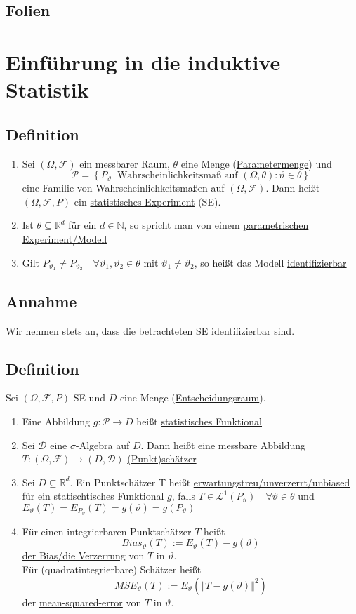 \documentclass[german,10pt,oneside, fleqn, a4paper]{article}
\newcommand {\R}	{\mathbb{R}}
\newcommand {\N}	{\mathbb{N}}
\newcommand{\ra}{\rightarrow}
\newcommand{\brc}[1]{\left(#1\right)}
\newcommand{\brac}[1]{\left\lbrace #1\right\rbrace}
\newcommand{\norm}[1]{\left\Vert #1 \right\Vert}
\newcommand{\mc}[1]{\mathcal{#1}}
\newcommand{\lp}[1]{\mc{L}^{#1}}
\newcommand{\1}[1]{1_{#1}}
\newcommand{\2}[1]{\1{\brac{#1}}}
\newcommand{\raum}{\brc{\Omega,\mc{F},P}}
\newcommand{\f}{\mc{F}}
\newcommand{\p}{\mc{P}}
\newcommand{\qf}{\quad\forall}
\begin{document}
\subsection{Folien}
%



\section{Einführung in die induktive Statistik}
\subsection{Definition}
\label{9.1}
\begin{enumerate}[label=(\roman*)]
\item Sei $(\Omega,\f)$ ein messbarer Raum, $\theta$ eine Menge (\underline{Parametermenge}) und \[\p=\brac{P_\vartheta\ \text{ Wahrscheinlichkeitsmaß auf }(\Omega,\theta):\vartheta\in\theta}\]
eine Familie von Wahrscheinlichkeitsmaßen auf $(\Omega,\f)$. Dann heißt $\raum$ ein \underline{statistisches Experiment} (SE).
\item Ist $\theta\subseteq\R^d$ für ein $d\in\N$, so spricht man von einem \underline{parametrischen Experiment/Modell}
\item Gilt $P_{\vartheta_1}\neq P_{\vartheta_2}\qf \vartheta_1,\vartheta_2\in\theta$ mit $\vartheta_1\neq\vartheta_2$, so heißt das Modell \underline{identifizierbar}
\end{enumerate}

\subsection{Annahme}
\label{9.2}
Wir nehmen stets an, dass die betrachteten SE identifizierbar sind.

\subsection{Definition}
\label{9.3}
Sei $\raum$ SE und $D$ eine Menge (\underline{Entscheidungsraum}).\begin{enumerate}[label=(\alph*)]
\item Eine Abbildung $g:\p\ra D$ heißt \underline{statistisches Funktional}
\item Sei $\mc{D}$ eine $\sigma$-Algebra auf $D$. Dann heißt eine messbare Abbildung $T:(\Omega,\f)\ra(D,\mc{D})$ \underline{(Punkt)schätzer}
\item Sei $D\subseteq\R^d$. Ein Punktschätzer T heißt \underline{erwartungstreu/unverzerrt/unbiased} für ein statischtisches Funktional $g$, falls $T\in\lp{1}(P_\vartheta)\qf \vartheta\in\theta$ und $E_\vartheta(T)=E_{P_\vartheta}(T)=g(\vartheta)=g(P_\vartheta)$
\item Für einen integrierbaren Punktschätzer $T$ heißt \[
Bias_\vartheta(T):=E_\vartheta(T)-g(\vartheta)\]
\underline{der Bias/die Verzerrung} von $T$ in $\vartheta$.\\
Für (quadratintegrierbare) Schätzer heißt \[
MSE_\vartheta(T):=E_\vartheta(\norm{T-g(\vartheta)}^2)\]
der \underline{mean-squared-error} von $T$ in $\vartheta$.
\end{enumerate}
\end{document}
